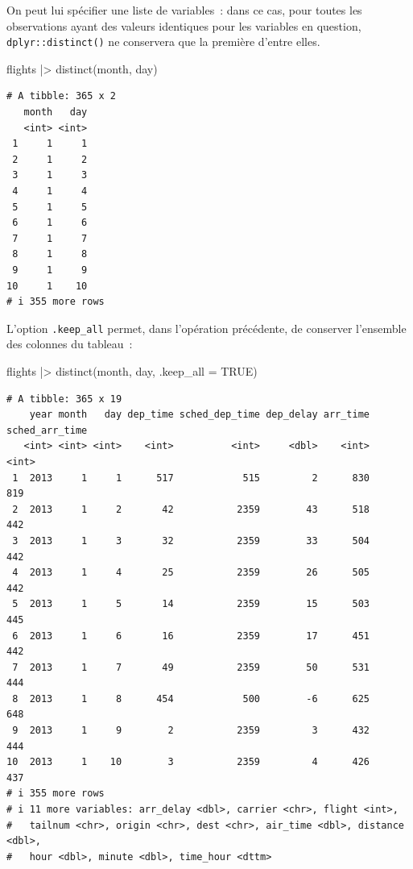 \documentclass[
  letterpaper,
  DIV=11,
  numbers=noendperiod,
  oneside]{scrreprt}
\newenvironment{Shaded}{\begin{snugshade}}{\end{snugshade}}
\newcommand{\AttributeTok}[1]{\textcolor[rgb]{0.40,0.45,0.13}{#1}}
\newcommand{\ConstantTok}[1]{\textcolor[rgb]{0.56,0.35,0.01}{#1}}
\newcommand{\FunctionTok}[1]{\textcolor[rgb]{0.28,0.35,0.67}{#1}}
\newcommand{\NormalTok}[1]{\textcolor[rgb]{0.00,0.23,0.31}{#1}}
\newcommand{\SpecialCharTok}[1]{\textcolor[rgb]{0.37,0.37,0.37}{#1}}
\begin{document}
On peut lui spécifier une liste de variables~: dans ce cas, pour toutes
les observations ayant des valeurs identiques pour les variables en
question, \texttt{dplyr::distinct()} ne conservera que la première
d'entre elles.

\begin{Shaded}
\begin{Highlighting}[]
\NormalTok{flights }\SpecialCharTok{|\textgreater{}}
  \FunctionTok{distinct}\NormalTok{(month, day)}
\end{Highlighting}
\end{Shaded}

\begin{verbatim}
# A tibble: 365 x 2
   month   day
   <int> <int>
 1     1     1
 2     1     2
 3     1     3
 4     1     4
 5     1     5
 6     1     6
 7     1     7
 8     1     8
 9     1     9
10     1    10
# i 355 more rows
\end{verbatim}

L'option \texttt{.keep\_all} permet, dans l'opération précédente, de
conserver l'ensemble des colonnes du tableau~:

\begin{Shaded}
\begin{Highlighting}[]
\NormalTok{flights }\SpecialCharTok{|\textgreater{}}
  \FunctionTok{distinct}\NormalTok{(month, day, }\AttributeTok{.keep\_all =} \ConstantTok{TRUE}\NormalTok{) }
\end{Highlighting}
\end{Shaded}

\begin{verbatim}
# A tibble: 365 x 19
    year month   day dep_time sched_dep_time dep_delay arr_time sched_arr_time
   <int> <int> <int>    <int>          <int>     <dbl>    <int>          <int>
 1  2013     1     1      517            515         2      830            819
 2  2013     1     2       42           2359        43      518            442
 3  2013     1     3       32           2359        33      504            442
 4  2013     1     4       25           2359        26      505            442
 5  2013     1     5       14           2359        15      503            445
 6  2013     1     6       16           2359        17      451            442
 7  2013     1     7       49           2359        50      531            444
 8  2013     1     8      454            500        -6      625            648
 9  2013     1     9        2           2359         3      432            444
10  2013     1    10        3           2359         4      426            437
# i 355 more rows
# i 11 more variables: arr_delay <dbl>, carrier <chr>, flight <int>,
#   tailnum <chr>, origin <chr>, dest <chr>, air_time <dbl>, distance <dbl>,
#   hour <dbl>, minute <dbl>, time_hour <dttm>
\end{verbatim}
\end{document}
